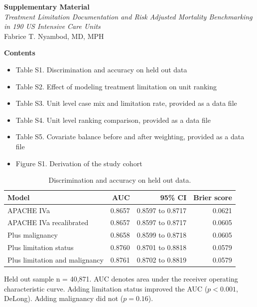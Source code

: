 \documentclass[12pt,a4paper]{article}
\begin{document}
\begin{center}
{\Large\bfseries Supplementary Material}\\[8pt]
{\itshape Treatment Limitation Documentation and Risk Adjusted Mortality
Benchmarking in 190 US Intensive Care Units}\\[6pt]
Fabrice T. Nyambod, MD, MPH
\end{center}

\vspace{10pt}
\noindent\textbf{Contents}

\begin{itemize}\setlength{\itemsep}{0pt}
\item Table S1. Discrimination and accuracy on held out data
\item Table S2. Effect of modeling treatment limitation on unit ranking
\item Table S3. Unit level case mix and limitation rate, provided as a data file
\item Table S4. Unit level ranking comparison, provided as a data file
\item Table S5. Covariate balance before and after weighting, provided as a data file
\item Figure S1. Derivation of the study cohort
\end{itemize}

\newpage

\begin{table}[htbp]
\centering
\small
\caption{Discrimination and accuracy on held out data.}
\label{tab:discrim}
\begin{tabular}{lrrr}
\toprule
Model & AUC & 95\% CI & Brier score \\
\midrule
APACHE IVa                       & 0.8657 & 0.8597 to 0.8717 & 0.0621 \\
APACHE IVa recalibrated          & 0.8657 & 0.8597 to 0.8717 & 0.0605 \\
Plus malignancy                  & 0.8658 & 0.8599 to 0.8718 & 0.0605 \\
Plus limitation status           & 0.8760 & 0.8701 to 0.8818 & 0.0579 \\
Plus limitation and malignancy   & 0.8761 & 0.8702 to 0.8819 & 0.0579 \\
\bottomrule
\end{tabular}

\vspace{2pt}
\footnotesize Held out sample n = 40{,}871. AUC denotes area under the receiver
operating characteristic curve. Adding limitation status improved the AUC
($p<0.001$, DeLong). Adding malignancy did not ($p=0.16$).
\end{table}
\end{document}
